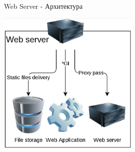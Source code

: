 \begin{frame}{Web Server - Архитектура}
  \begin{center}
    \includegraphics[height=7cm,keepaspectratio]{sources/images/Web_Server_architecture.png}
  \end{center}
\end{frame}